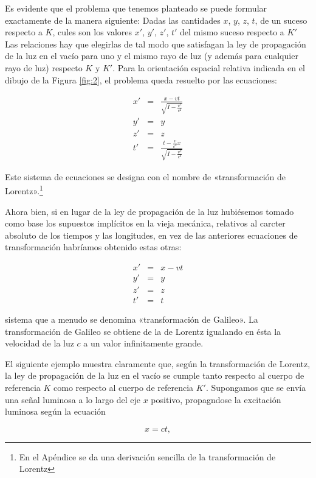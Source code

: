 \documentclass[spanish]{book}
\begin{document}
Es evidente que el problema que tenemos planteado se puede formular exactamente
de la manera siguiente: Dadas las cantidades $x$, $y$, $z$, $t$, de un suceso respecto a $K$,
cules son los valores $x'$, $y'$, $z'$, $t'$ del mismo suceso respecto a $K'$ Las relaciones hay
que elegirlas de tal modo que satisfagan la ley de propagación de la luz en el vacío
para uno y el mismo rayo de luz (y además para cualquier rayo de luz) respecto $K$ y $K'$.
Para la orientación espacial relativa indicada en el dibujo de la Figura \ref{fig:2}, el
problema queda resuelto por las ecuaciones:

\begin{eqnarray*}
x' & = & \frac{x-vt}{\sqrt{I-\frac{v^{2}}{c^{2}}}}\\
y' & = & y\\
z' & = & z\\
t' & = & \frac{t-\frac{v}{c^{2}}x}{\sqrt{I-\frac{v^{2}}{c^{2}}}}
\end{eqnarray*}

\noindent   Este sistema de ecuaciones se designa con el nombre de «transformación de
Lorentz».\footnote{En el Apéndice se da una derivación sencilla de la transformación de Lorentz}

Ahora bien, si en lugar de la ley de propagación de la luz hubiésemos tomado como
base los supuestos implícitos en la vieja mecánica, relativos al carcter absoluto de los
tiempos y las longitudes, en vez de las anteriores ecuaciones de transformación
habríamos obtenido estas otras:

\begin{eqnarray*}
x' & = & x-vt\\
y' & = & y\\
z' & = & z\\
t' & = & t
\end{eqnarray*}

\noindent sistema que a menudo se denomina «transformación de Galileo». La transformación de
Galileo se obtiene de la de Lorentz igualando en ésta la velocidad de la luz
$c$ a un valor infinitamente grande.

El siguiente ejemplo muestra claramente que, según la transformación de Lorentz,
la ley de propagación de la luz en el vacío se cumple tanto respecto al cuerpo de
referencia $K$ como respecto al cuerpo de referencia $K'$. Supongamos que se envía una
señal luminosa a lo largo del eje $x$ positivo, propagndose la excitación luminosa según
la ecuación

\[x=ct,\]
\end{document}
